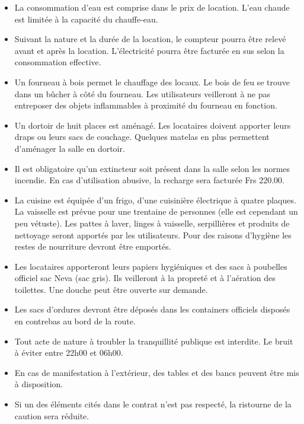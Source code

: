 \documentclass[a4paper,12pt]{extarticle}
\begin{document}
\begin{itemize}
\item La consommation d'eau est comprise dans le prix de location.
L'eau chaude est limitée à la capacité du chauffe-eau.

\item Suivant la nature et la durée de la location, le compteur pourra être relevé avant et après la location.
L'électricité pourra être facturée en sus selon la consommation effective.

\item Un fourneau à bois permet le chauffage des locaux. Le bois de feu se trouve dans un bûcher à côté du fourneau.
Les utilisateurs veilleront à ne pas entreposer des objets inflammables à proximité du fourneau en fonction.

\item Un dortoir de huit places est aménagé. Les locataires doivent apporter leurs draps
ou leurs sacs de couchage. Quelques matelas en plus permettent d'aménager la salle
en dortoir.

\item Il est obligatoire qu'un extincteur soit présent dans la salle selon les normes incendie.
En cas d'utilisation abusive, la recharge sera facturée Frs 220.00.

\item La cuisine est équipée d'un frigo, d'une cuisinière électrique à quatre plaques.
La vaisselle est prévue pour une trentaine de personnes (elle est cependant un peu vétuste).
Les pattes à laver, linges à vaisselle, serpillières et produits de nettoyage seront apportés par les utilisateurs.
Pour des raisons d'hygiène les restes de nourriture devront être emportés.

\item Les locataires apporteront leurs papiers hygiéniques et des sacs à poubelles officiel sac Neva (sac gris).
Ils veilleront à la propreté et à l'aération des toilettes.
Une douche peut être ouverte sur demande.

\item Les sacs d'ordures devront être déposés dans les containers officiels disposés en contrebas au bord de la route.

\item Tout acte de nature à troubler la tranquillité publique est interdite. Le bruit à éviter entre 22h00 et 06h00.

\item En cas de manifestation à l'extérieur, des tables et des bancs peuvent être mis à disposition.

\item Si un des éléments cités dans le contrat n'est pas respecté, la ristourne de la caution sera réduite.
\end{itemize}
\end{document}
